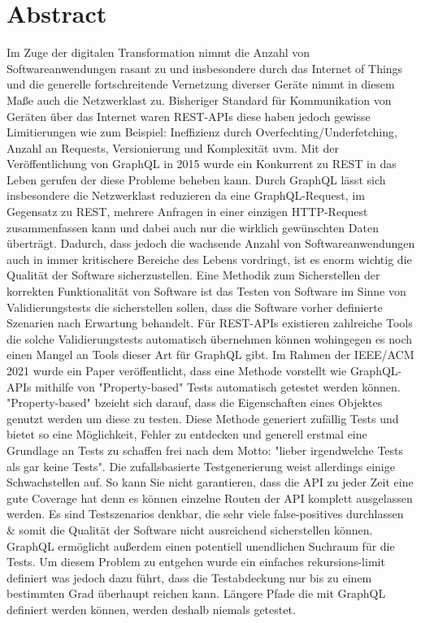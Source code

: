 \chapter{Abstract}

Im Zuge der digitalen Transformation nimmt die Anzahl von Softwareanwendungen rasant zu und insbesondere durch das
Internet of Things und die generelle fortschreitende Vernetzung diverser Geräte nimmt in diesem Maße auch die Netzwerklast
zu.
Bisheriger Standard für Kommunikation von Geräten über das Internet waren REST-APIs diese haben jedoch gewisse
Limitierungen wie zum Beispiel: Ineffizienz durch Overfechting/Underfetching, Anzahl an Requests, Versionierung und Komplexität uvm.
Mit der Veröffentlichung von GraphQL in 2015 wurde ein Konkurrent zu REST in das Leben gerufen der diese Probleme beheben kann.
Durch GraphQL lässt sich insbesondere die Netzwerklast reduzieren da eine GraphQL-Request, im Gegensatz zu REST, mehrere Anfragen in einer
einzigen HTTP-Request zusammenfassen kann und dabei auch nur die wirklich gewünschten Daten überträgt.
Dadurch, dass jedoch die wachsende Anzahl von Softwareanwendungen auch in immer kritischere Bereiche des Lebens vordringt, ist es
enorm wichtig die Qualität der Software sicherzustellen.
Eine Methodik zum Sicherstellen der korrekten Funktionalität von Software ist das Testen von Software im Sinne von Validierungstests die sicherstellen sollen,
dass die Software vorher definierte Szenarien nach Erwartung behandelt.
Für REST-APIs existieren zahlreiche Tools die solche Validierungstests automatisch übernehmen können wohingegen es noch einen Mangel
an Tools dieser Art für GraphQL gibt.
Im Rahmen der IEEE/ACM 2021 wurde ein Paper veröffentlicht, dass eine Methode vorstellt wie GraphQL-APIs mithilfe von
"Property-based" Tests automatisch getestet werden können.
"Property-based" bzeieht sich darauf, dass die Eigenschaften eines Objektes genutzt werden um diese zu testen.
Diese Methode generiert zufällig Tests und bietet so eine Möglichkeit, Fehler zu entdecken und
generell erstmal eine Grundlage an Tests zu schaffen frei nach dem Motto: "lieber irgendwelche Tests als gar keine Tests".
Die zufallsbasierte Testgenerierung weist allerdings einige Schwachstellen auf.
So kann Sie nicht garantieren, dass die API zu jeder Zeit eine gute Coverage hat denn es können einzelne Routen der API
komplett ausgelassen werden.
Es sind Testszenarios denkbar, die sehr viele false-positives durchlassen \& somit die Qualität der Software nicht ausreichend sicherstellen können.
GraphQL ermöglicht außerdem einen potentiell unendlichen Suchraum für die Tests.
Um diesem Problem zu entgehen wurde ein einfaches rekursions-limit definiert was jedoch dazu führt, dass die Testabdeckung nur bis zu einem
bestimmten Grad überhaupt reichen kann.
Längere Pfade die mit GraphQL definiert werden können, werden deshalb niemals getestet.

